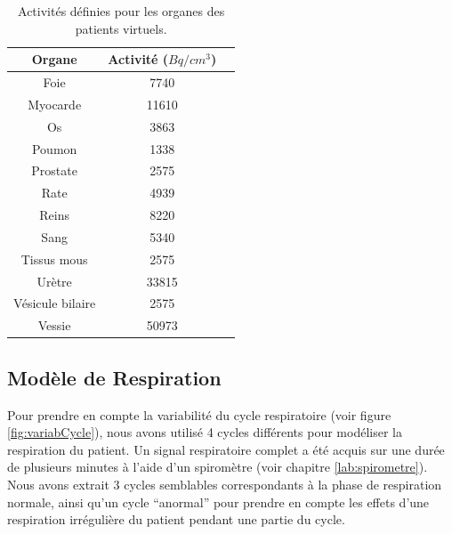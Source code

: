 \begin{table}
\centering
 \begin{tabular}{|c|c|c|} 
\hline
Organe 		& Activité ($Bq/cm^3$) \\
\hline
\hline
Foie		& 7740		       \\
\hline
Myocarde	& 11610		       \\
\hline
Os		& 3863		       \\
\hline
Poumon 		& 1338 		       \\
\hline
Prostate	& 2575		       \\
\hline
Rate		& 4939		       \\
\hline
Reins		& 8220		       \\
\hline
Sang		& 5340		       \\
\hline
Tissus mous 	& 2575 		       \\
\hline
Urètre		& 33815		       \\
\hline
Vésicule bilaire& 2575		       \\
\hline
Vessie		& 50973		       \\
\hline
 \end{tabular}

\caption[Activités des organes des patients de la base de données]{Activités définies pour les organes des patients virtuels.}
\label{tab:activiteOrganes}
\end{table}

\subsection{Modèle de Respiration}


Pour prendre en compte la variabilité du cycle respiratoire (voir figure \ref{fig:variabCycle}), nous avons utilisé 4 cycles différents pour modéliser la respiration du patient. Un signal respiratoire complet a été acquis sur une durée de plusieurs minutes à l'aide d'un spiromètre (voir chapitre \ref{lab:spirometre}). Nous avons extrait 3 cycles semblables correspondants à la phase de respiration normale, ainsi qu'un cycle ``anormal'' pour prendre en compte les effets d'une respiration irrégulière du patient pendant une partie du cycle.

